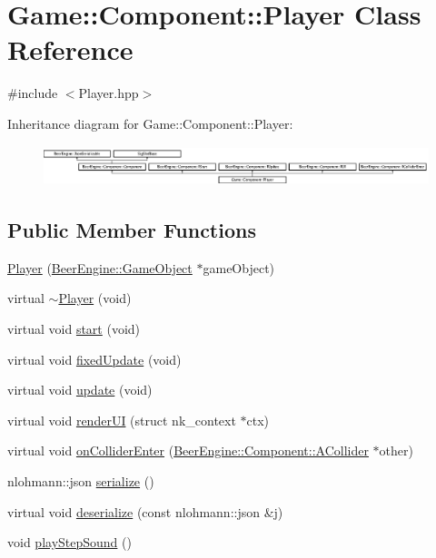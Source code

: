 \hypertarget{class_game_1_1_component_1_1_player}{}\section{Game\+:\+:Component\+:\+:Player Class Reference}
\label{class_game_1_1_component_1_1_player}


{\ttfamily \#include $<$Player.\+hpp$>$}

Inheritance diagram for Game\+:\+:Component\+:\+:Player\+:\begin{figure}[H]
\begin{center}
\leavevmode
\includegraphics[height=1.176471cm]{class_game_1_1_component_1_1_player}
\end{center}
\end{figure}
\subsection*{Public Member Functions}
\begin{DoxyCompactItemize}
\item 
\mbox{\hyperlink{class_game_1_1_component_1_1_player_a3568c25cf29f9931ed2c07208c98ee30}{Player}} (\mbox{\hyperlink{class_beer_engine_1_1_game_object}{Beer\+Engine\+::\+Game\+Object}} $\ast$game\+Object)
\item 
virtual \mbox{\hyperlink{class_game_1_1_component_1_1_player_ad2c9c1cfbbbd0187fb8df8f6d7e4010f}{$\sim$\+Player}} (void)
\item 
virtual void \mbox{\hyperlink{class_game_1_1_component_1_1_player_a317e5d073713ea27ceffe5de642240a6}{start}} (void)
\item 
virtual void \mbox{\hyperlink{class_game_1_1_component_1_1_player_aacbb2bc974b4b81434abd49eb8f91999}{fixed\+Update}} (void)
\item 
virtual void \mbox{\hyperlink{class_game_1_1_component_1_1_player_a52212c267395699de71b77e88b93032d}{update}} (void)
\item 
virtual void \mbox{\hyperlink{class_game_1_1_component_1_1_player_a5d5f837406a8e9f62dbe2c83ab3751b6}{render\+UI}} (struct nk\+\_\+context $\ast$ctx)
\item 
virtual void \mbox{\hyperlink{class_game_1_1_component_1_1_player_a68981bff23caf1fa65ea9a9007265b54}{on\+Collider\+Enter}} (\mbox{\hyperlink{class_beer_engine_1_1_component_1_1_a_collider}{Beer\+Engine\+::\+Component\+::\+A\+Collider}} $\ast$other)
\item 
nlohmann\+::json \mbox{\hyperlink{class_game_1_1_component_1_1_player_a164f1424c0ff3d603ee60301e0aee6a7}{serialize}} ()
\item 
virtual void \mbox{\hyperlink{class_game_1_1_component_1_1_player_a448003673bc03c81447887b9a6d38084}{deserialize}} (const nlohmann\+::json \&j)
\item 
void \mbox{\hyperlink{class_game_1_1_component_1_1_player_a87921f894ec75727bb1d83aa660573d1}{play\+Step\+Sound}} ()
\end{DoxyCompactItemize}
